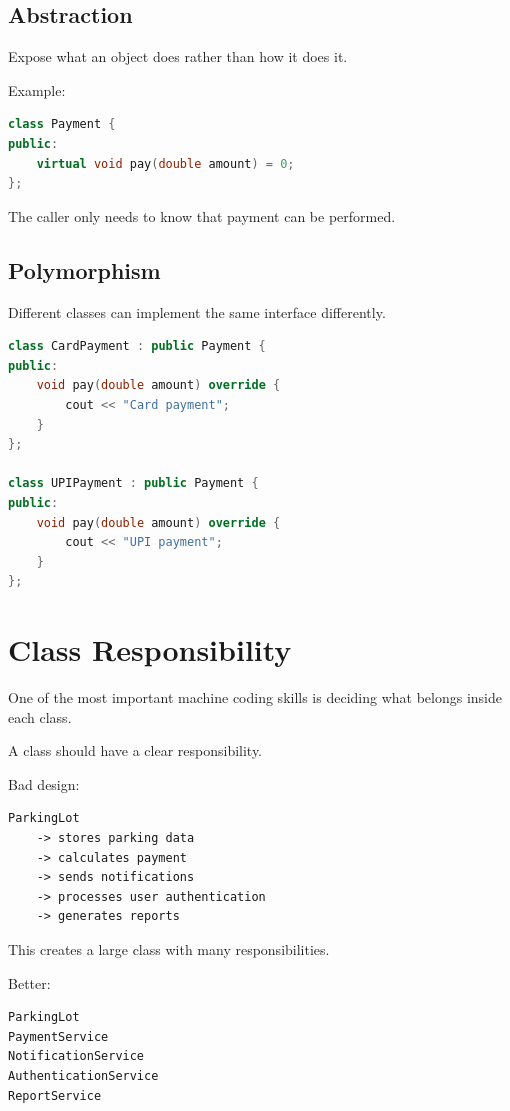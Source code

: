 \documentclass[12pt,a4paper]{article}
\begin{document}
\subsection{Abstraction}

Expose what an object does rather than how it does it.

Example:

\begin{lstlisting}[language=C++]
class Payment {
public:
    virtual void pay(double amount) = 0;
};
\end{lstlisting}

The caller only needs to know that payment can be performed.

\subsection{Polymorphism}

Different classes can implement the same interface differently.

\begin{lstlisting}[language=C++]
class CardPayment : public Payment {
public:
    void pay(double amount) override {
        cout << "Card payment";
    }
};

class UPIPayment : public Payment {
public:
    void pay(double amount) override {
        cout << "UPI payment";
    }
};
\end{lstlisting}

\section{Class Responsibility}

One of the most important machine coding skills is deciding what belongs inside each class.

A class should have a clear responsibility.

Bad design:

\begin{verbatim}
ParkingLot
    -> stores parking data
    -> calculates payment
    -> sends notifications
    -> processes user authentication
    -> generates reports
\end{verbatim}

This creates a large class with many responsibilities.

Better:

\begin{verbatim}
ParkingLot
PaymentService
NotificationService
AuthenticationService
ReportService
\end{verbatim}
\end{document}
